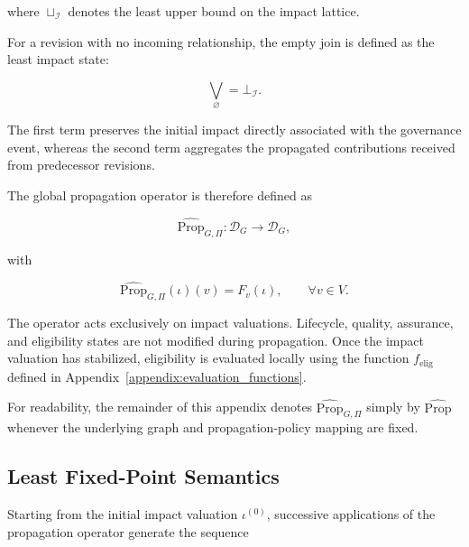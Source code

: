 \documentclass[10pt]{article}
\begin{document}
	where $\sqcup_{\mathcal I}$ denotes the least upper bound on the impact lattice.
	
	For a revision with no incoming relationship, the empty join is defined as the
	least impact state:
	
	\begin{equation}
		\bigvee_{\varnothing}
		=
		\bot_{\mathcal I}.
		\label{eq:empty_impact_join}
	\end{equation}
	
	The first term preserves the initial impact directly associated with the
	governance event, whereas the second term aggregates the propagated
	contributions received from predecessor revisions.
	
	
	The global propagation operator is therefore defined as
	
	\begin{equation}
		\label{eq:impact_operator}
		\widehat{\mathrm{Prop}}_{G,\Pi}
		:
		\mathcal D_G
		\rightarrow
		\mathcal D_G,
	\end{equation}
	
	with
	
	\begin{equation}
		\label{eq:impact_operator_definition}
		\widehat{\mathrm{Prop}}_{G,\Pi}(\iota)(v)
		=
		F_v(\iota),
		\qquad
		\forall v\in V.
	\end{equation}
	
	The operator acts exclusively on impact valuations.
	Lifecycle, quality, assurance, and eligibility states are not modified during
	propagation. Once the impact valuation has stabilized, eligibility is evaluated
	locally using the function
	$f_{\mathrm{elig}}$
	defined in Appendix~\ref{appendix:evaluation_functions}.
	
	For readability, the remainder of this appendix denotes
	$\widehat{\mathrm{Prop}}_{G,\Pi}$ simply by
	$\widehat{\mathrm{Prop}}$
	whenever the underlying graph and propagation-policy mapping are fixed.
	
	\subsection{Least Fixed-Point Semantics}
	
	Starting from the initial impact valuation
	$\iota^{(0)}$, successive applications of the propagation operator generate the
	sequence
	
\end{document}
